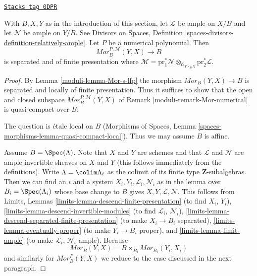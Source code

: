 \begin{lemma}
\label{moduli-lemma-Mor-qc-over-base}
\href{https://stacks.math.columbia.edu/tag/0DPR}{\texttt{Stacks tag 0DPR}}

With $B, X, Y$ as in the introduction of this section, let
$\mathcal{L}$ be ample on $X/B$ and let $\mathcal{N}$ be ample on $Y/B$.
See Divisors on Spaces, Definition
\ref{spaces-divisors-definition-relatively-ample}.
Let $P$ be a numerical polynomial. Then
$$
\mathit{Mor}^{P, \mathcal{M}}_B(Y, X) \longrightarrow B
$$
is separated and of finite presentation where
$\mathcal{M} = \text{pr}_1^*\mathcal{N}
\otimes_{\mathcal{O}_{Y \times_B X}} \text{pr}_2^*\mathcal{L}$.
\end{lemma}

\begin{proof}

By Lemma \ref{moduli-lemma-Mor-s-lfp} the morphism $\mathit{Mor}_B(Y, X) \to B$
is separated and locally of finite presentation. Thus it suffices to
show that the open and closed subspace $\mathit{Mor}^{P, \mathcal{M}}_B(Y, X)$
of Remark \ref{moduli-remark-Mor-numerical} is quasi-compact over $B$.

\medskip\noindent
The question is \'etale local on $B$
(Morphisms of Spaces, Lemma \ref{spaces-morphisms-lemma-quasi-compact-local}).
Thus we may assume $B$ is affine.

\medskip\noindent
Assume $B = \Spec(\Lambda)$. Note that $X$ and
$Y$ are schemes and that $\mathcal{L}$ and $\mathcal{N}$ are ample
invertible sheaves on $X$ and $Y$ (this follows immediately from the
definitions). Write $\Lambda = \colim \Lambda_i$ as the
colimit of its finite type $\mathbf{Z}$-subalgebras. Then
we can find an $i$ and a system $X_i, Y_i, \mathcal{L}_i, \mathcal{N}_i$
as in the lemma over $B_i = \Spec(\Lambda_i)$ whose base change to
$B$ gives $X, Y, \mathcal{L}, \mathcal{N}$. This follows from
Limits, Lemmas
\ref{limits-lemma-descend-finite-presentation} (to find $X_i$, $Y_i$),
\ref{limits-lemma-descend-invertible-modules} (to find $\mathcal{L}_i$,
$\mathcal{N}_i$), \ref{limits-lemma-descend-separated-finite-presentation}
(to make $X_i \to B_i$ separated), \ref{limits-lemma-eventually-proper}
(to make $Y_i \to B_i$ proper), and \ref{limits-lemma-limit-ample}
(to make $\mathcal{L}_i$, $\mathcal{N}_i$ ample).
Because
$$
\mathit{Mor}_B(Y, X) = B \times_{B_i} \mathit{Mor}_{B_i}(Y_i, X_i)
$$
and similarly for $\mathit{Mor}^P_B(Y, X)$ we reduce
to the case discussed in the next paragraph.


\end{proof}

